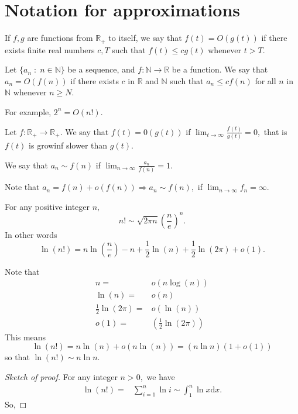 \section{Notation for approximations}
\begin{definition}[O notation]
	If $f,g$ are functions from $\mathbb{R}_+$ to itself, we say that $f(t) = O(g(t))$ if
	there exists finite real numbers $c, T$ such that $ f(t) \leq c g(t)$ whenever $ t > T.$
\end{definition}

\begin{definition}
	Let $ \{ a_n \; : \; n \in \mathbb{N} \}$ be a sequence, and $ f\colon \mathbb{N} \to \mathbb{R}$ be a function. We say that $a_n = O(f(n))$ if there exists $ c $ in $\mathbb{R}$ and 
	$\mathbb{N}$ such that $ a_n \leq c f(n)$ for all $n $ in $\mathbb{N}$ whenever $n \geq N.$
\end{definition}
For example, $2^n = O(n!).$
\begin{definition}
	Let $f \colon \mathbb{R}_+ \to \mathbb{R}_+.$
	We say that $f(t) = 0(g(t))$ if $\lim_{t \to \infty} \frac{f(t)}{g(t)} = 0,$
	that is $f(t)$ is growinf slower than $g(t).$
\end{definition}
\begin{example}
	We say that $a_n \sim f(n)$ if $\lim_{n \to \infty} \frac{a_n}{f(n)} = 1.$	
\end{example}
Note that $a_n = f(n) + o(f(n)) \Rightarrow a_n \sim f(n),$ if $\lim_{n \to \infty} 
f_n = \infty.$
\begin{theorem}
	For any positive integer $n,$
	$$ n! \sim \sqrt{2 \pi n} \left( \frac{n}{e} \right)^n .$$
	In other words
	$$ \ln(n!) = n \ln \left( \frac{n}{e}  \right) - n + \frac{1}{2} \ln(n)
	+ \frac{1}{2} \ln(2 \pi ) + o(1).$$
\end{theorem}

\begin{remark}
	Note that
	\begin{align*}
		n ={}&  o(n \log (n)) \\
		\ln(n)={}& o(n) \\
		\frac{1}{2} \ln(2 \pi) ={}& o(\ln(n))\\
		o(1) ={}& \left( \frac{1}{2} \ln(2 \pi) \right)
	\end{align*}
	This means 
	$$ \ln(n!) = n \ln(n) + o(n \ln(n)) = (n \ln n)(1 + o(1))$$
	so that $\ln(n!) \sim n \ln n.$
\end{remark}

\begin{proof}[Sketch of proof]
	For any integer $n > 0,$ we have
	\begin{align*}
		\ln(n!) ={}& \sum_{i=1}^{n} \ln i \sim \int_1^n \ln x \mathrm{d} x.
	\end{align*}
	So,
\end{proof}

